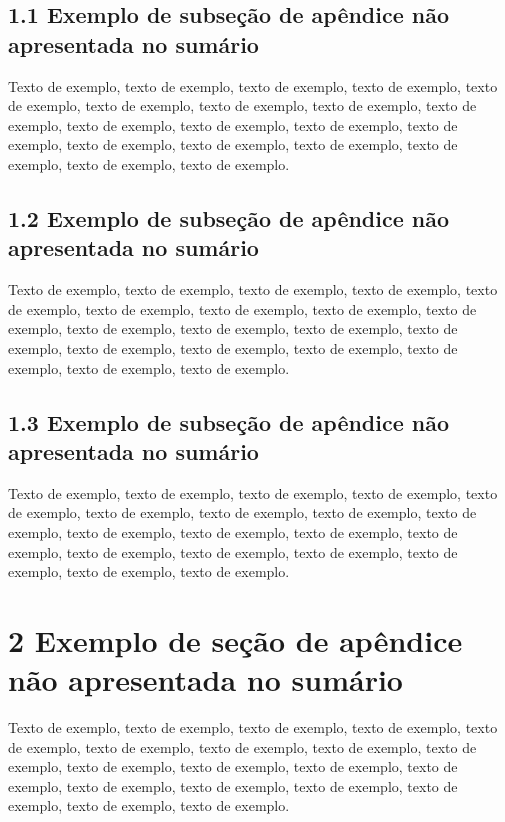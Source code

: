 \documentclass[
	12pt,				%
	oneside,			%
	a4paper,			%
	english,			%
	brazil				%
	]{abntex2ppgsi}
\begin{document}
\begin{apendicesenv}
\subsection*{1.1 Exemplo de subseção de apêndice não apresentada no sumário}

Texto de exemplo, texto de exemplo, texto de exemplo, texto de exemplo, texto de exemplo, texto de exemplo, texto de exemplo, texto de exemplo, texto de exemplo, texto de exemplo, texto de exemplo, texto de exemplo, texto de exemplo, texto de exemplo, texto de exemplo, texto de exemplo, texto de exemplo, texto de exemplo, texto de exemplo.

\subsection*{1.2 Exemplo de subseção de apêndice não apresentada no sumário}

Texto de exemplo, texto de exemplo, texto de exemplo, texto de exemplo, texto de exemplo, texto de exemplo, texto de exemplo, texto de exemplo, texto de exemplo, texto de exemplo, texto de exemplo, texto de exemplo, texto de exemplo, texto de exemplo, texto de exemplo, texto de exemplo, texto de exemplo, texto de exemplo, texto de exemplo.

\subsection*{1.3 Exemplo de subseção de apêndice não apresentada no sumário}

Texto de exemplo, texto de exemplo, texto de exemplo, texto de exemplo, texto de exemplo, texto de exemplo, texto de exemplo, texto de exemplo, texto de exemplo, texto de exemplo, texto de exemplo, texto de exemplo, texto de exemplo, texto de exemplo, texto de exemplo, texto de exemplo, texto de exemplo, texto de exemplo, texto de exemplo.

\section*{2 Exemplo de seção de apêndice não apresentada no sumário}

Texto de exemplo, texto de exemplo, texto de exemplo, texto de exemplo, texto de exemplo, texto de exemplo, texto de exemplo, texto de exemplo, texto de exemplo, texto de exemplo, texto de exemplo, texto de exemplo, texto de exemplo, texto de exemplo, texto de exemplo, texto de exemplo, texto de exemplo, texto de exemplo, texto de exemplo.


\end{apendicesenv}
\end{document}
